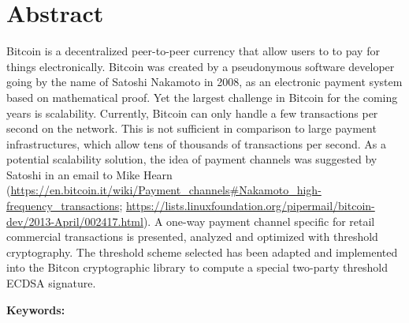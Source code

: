 \chapter*{Abstract}

Bitcoin is a decentralized peer-to-peer currency that allow users to to pay for
things electronically. Bitcoin was created by a pseudonymous software developer going by the name of
Satoshi Nakamoto in 2008, as an electronic payment system based on mathematical proof.
Yet the largest challenge in Bitcoin for the coming years is scalability.
Currently, Bitcoin can only handle a few transactions per second on the network.
This is not sufficient in comparison to large payment infrastructures, which allow tens of
thousands of transactions per second. As a potential scalability solution, the idea of payment channels was suggested by Satoshi in an email to Mike Hearn (\url{https://en.bitcoin.it/wiki/Payment_channels#Nakamoto_high-frequency_transactions}; \url{https://lists.linuxfoundation.org/pipermail/bitcoin-dev/2013-April/002417.html}).
A one-way payment channel specific for retail commercial transactions is presented, analyzed and optimized with
threshold cryptography. The threshold scheme selected has been adapted and implemented
into the Bitcon cryptographic library to compute a special two-party threshold ECDSA signature.

\vskip0.5cm
\noindent\textbf{Keywords:}
\Keywords
